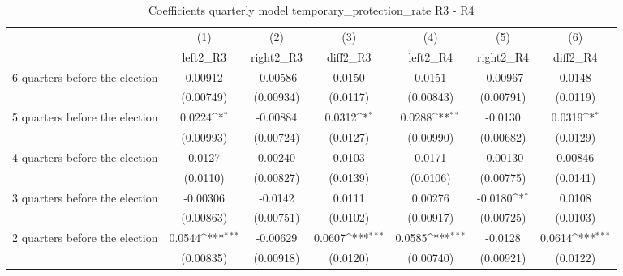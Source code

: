 \begin{table}[htbp]\centering
\def\sym#1{\ifmmode^{#1}\else\(^{#1}\)\fi}
\caption{Coefficients quarterly model temporary\_protection\_rate R3 - R4}
\begin{tabular}{l*{6}{c}}
\hline\hline
                    &\multicolumn{1}{c}{(1)}&\multicolumn{1}{c}{(2)}&\multicolumn{1}{c}{(3)}&\multicolumn{1}{c}{(4)}&\multicolumn{1}{c}{(5)}&\multicolumn{1}{c}{(6)}\\
                    &\multicolumn{1}{c}{left2\_R3}&\multicolumn{1}{c}{right2\_R3}&\multicolumn{1}{c}{diff2\_R3}&\multicolumn{1}{c}{left2\_R4}&\multicolumn{1}{c}{right2\_R4}&\multicolumn{1}{c}{diff2\_R4}\\
\hline
 6 quarters before the election&     0.00912         &    -0.00586         &      0.0150         &      0.0151         &    -0.00967         &      0.0148         \\
                    &   (0.00749)         &   (0.00934)         &    (0.0117)         &   (0.00843)         &   (0.00791)         &    (0.0119)         \\
[1em]
 5 quarters before the election&      0.0224\sym{*}  &    -0.00884         &      0.0312\sym{*}  &      0.0288\sym{**} &     -0.0130         &      0.0319\sym{*}  \\
                    &   (0.00993)         &   (0.00724)         &    (0.0127)         &   (0.00990)         &   (0.00682)         &    (0.0129)         \\
[1em]
 4 quarters before the election&      0.0127         &     0.00240         &      0.0103         &      0.0171         &    -0.00130         &     0.00846         \\
                    &    (0.0110)         &   (0.00827)         &    (0.0139)         &    (0.0106)         &   (0.00775)         &    (0.0141)         \\
[1em]
 3 quarters before the election&    -0.00306         &     -0.0142         &      0.0111         &     0.00276         &     -0.0180\sym{*}  &      0.0108         \\
                    &   (0.00863)         &   (0.00751)         &    (0.0102)         &   (0.00917)         &   (0.00725)         &    (0.0103)         \\
[1em]
 2 quarters before the election&      0.0544\sym{***}&    -0.00629         &      0.0607\sym{***}&      0.0585\sym{***}&     -0.0128         &      0.0614\sym{***}\\
                    &   (0.00835)         &   (0.00918)         &    (0.0120)         &   (0.00740)         &   (0.00921)         &    (0.0122)         \\

\end{tabular}
\end{table}
